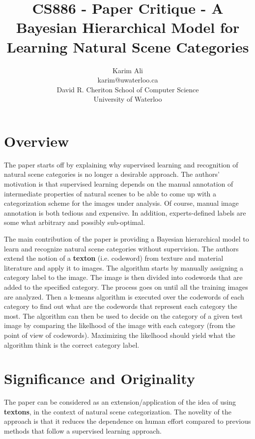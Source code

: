 \documentclass[11pt,a4paper]{article}
\begin{document}
\title{CS886 - Paper Critique - A Bayesian Hierarchical Model for Learning Natural Scene Categories}

\author{Karim Ali\\
karim@uwaterloo.ca\\
David R. Cheriton School of Computer Science\\
University of Waterloo\\
}

\date{}

\maketitle

\section{Overview}
The paper starts off by explaining why supervised learning and recognition of natural scene categories is no longer a desirable approach. The authors'
motivation is that supervised learning depends on the manual annotation of intermediate properties of natural scenes to be able to come up with a categorization
scheme for the images under analysis. Of course, manual image annotation is both tedious and expensive. In addition, experts-defined labels are some what
arbitrary and possibly sub-optimal.

The main contribution of the paper is providing a Bayesian hierarchical model to learn and recognize natural scene categories without supervision. The authors
extend the notion of a \textbf{texton} (i.e. codeword) from texture and material literature and apply it to images. The algorithm starts by manually assigning a
category label to the image. The image is then divided into codewords that are added to the specified category. The process goes on until all the training
images are analyzed. Then a k-means algorithm is executed over the codewords of each category to find out what are the codewords that represent each
category the most. The algorithm can then be used to decide on the category of a given test image by comparing the likelhood of the image with each category
(from the point of view of codewords). Maximizing the likelhood should yield what the algorithm think is the correct category label.

\section{Significance and Originality}
The paper can be considered as an extension/application of the idea of using \textbf{textons}, in the context of natural scene categorization. The novelity of
the approach is that it reduces the dependence on human effort compared to previous methods that follow a supervised learning approach.
\end{document}
